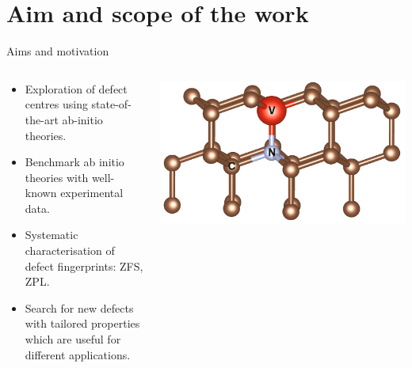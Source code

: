 \documentclass[notes=hide]{beamer}
\begin{document}
\section{Aim and scope of the work} %
\begin{frame}{Aims and motivation}

  \begin{columns}
    \begin{column}{0.5\textwidth}
      \begin{itemize}

        \item
          Exploration of defect centres using state-of-the-art ab-initio
          theories.

        \item
          Benchmark ab initio theories with well-known
          experimental data.

        \item
          Systematic characterisation of defect fingerprints: ZFS, ZPL.

        \item
          Search for new defects with tailored properties which are useful
          for different applications.


      \end{itemize}
    \end{column}
    \begin{column}{0.5\textwidth}
      \begin{center}
        \includegraphics[width=1\textwidth]{images/POSCAR_16_view.png}
      \end{center}
    \end{column}
  \end{columns}


\end{frame}
\end{document}

